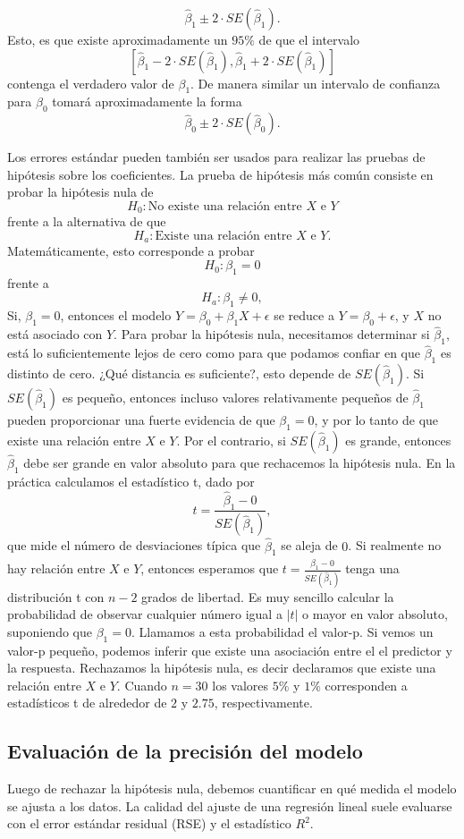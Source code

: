 $$\hat{\beta}_1\pm 2\cdot SE(\hat{\beta}_1).$$
Esto, es que existe aproximadamente un $95\%$ de que el intervalo
$$\left[\hat{\beta}_1-2\cdot SE(\hat{\beta}_1),\hat{\beta}_1+2\cdot SE(\hat{\beta}_1)\right]$$
contenga el verdadero valor de $\beta_1$. De manera similar un intervalo de confianza para $\beta_0$ tomará aproximadamente la forma 
$$\hat{\beta}_0\pm 2\cdot SE(\hat{\beta}_0).$$

Los errores estándar pueden también ser usados para realizar las pruebas de hipótesis sobre los coeficientes. La prueba de hipótesis más común consiste en probar la hipótesis nula de 
$$H_0: \mbox{No existe una relación entre } X \mbox{ e } Y$$
frente a la alternativa de que
$$H_a: \mbox{Existe una relación entre } X \mbox{ e } Y.$$
Matemáticamente, esto corresponde a probar
$$H_0: \beta_1=0$$
frente a
$$H_a: \beta_1\neq 0,$$
Si, $\beta_1=0$, entonces el modelo $Y=\beta_0 + \beta_1X + \epsilon$ se reduce a $Y=\beta_0+\epsilon$, y $X$ no está asociado con $Y$. Para probar la hipótesis nula, necesitamos determinar si $\hat{\beta}_1$, está lo suficientemente lejos de cero como para que podamos confiar en que $\hat{\beta}_1$ es distinto de cero. ¿Qué distancia es suficiente?, esto depende de $SE(\hat{\beta}_1)$. Si $SE(\hat{\beta}_1)$ es pequeño, entonces incluso valores relativamente pequeños de $\hat{\beta}_1$ pueden proporcionar una fuerte evidencia de que $\beta_1=0$, y por lo tanto de que existe una relación entre $X$ e $Y$. Por el contrario, si $SE(\hat{\beta}_1)$  es grande, entonces $\hat{\beta}_1$ debe ser grande en valor absoluto para que rechacemos la hipótesis nula. En la práctica calculamos el estadístico t, dado por
$$t=\dfrac{\hat{\beta}_1-0}{SE(\hat{\beta}_1)},$$
que mide el número de desviaciones típica que $\hat{\beta}_1$ se aleja de $0$. Si realmente no hay relación entre $X$ e $Y$, entonces esperamos que $t=\frac{\hat{\beta}_1-0}{SE(\hat{\beta}_1)}$ tenga una distribución t con $n-2$ grados de libertad. Es muy sencillo calcular la probabilidad de observar cualquier número igual a $|t|$ o mayor en valor absoluto, suponiendo que $\beta_1=0$. Llamamos a esta probabilidad el valor-p. Si vemos un valor-p pequeño, podemos inferir que existe una asociación entre el el predictor y la respuesta. Rechazamos la hipótesis nula, es decir declaramos que existe una relación entre $X$ e $Y$. Cuando $n=30$ los valores $5\%$ y $1\%$ corresponden a estadísticos t de alrededor de $2$ y $2.75$, respectivamente.


\subsection{Evaluación de la precisión del modelo}
Luego de rechazar la hipótesis nula, debemos cuantificar en qué medida el modelo se ajusta a los datos. La calidad del ajuste de una regresión lineal suele evaluarse con el error estándar residual (RSE) y el estadístico $R^2$.

